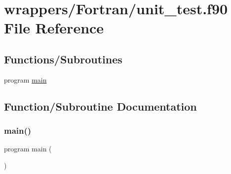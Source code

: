 \hypertarget{unit__test_8f90}{}\section{wrappers/\+Fortran/unit\+\_\+test.f90 File Reference}
\label{unit__test_8f90}
\subsection*{Functions/\+Subroutines}
\begin{DoxyCompactItemize}
\item 
program \hyperlink{unit__test_8f90_a8ec2266d83cd6c0b762cbcbc92c0af3d}{main}
\end{DoxyCompactItemize}


\subsection{Function/\+Subroutine Documentation}
\mbox{\label{unit__test_8f90_a8ec2266d83cd6c0b762cbcbc92c0af3d}} 
\subsubsection{\texorpdfstring{main()}{main()}}
{\footnotesize\ttfamily program main (\begin{DoxyParamCaption}{ }\end{DoxyParamCaption})}

